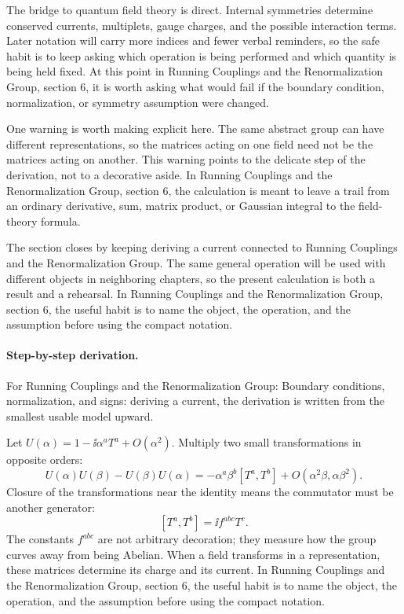 The bridge to quantum field theory is direct.  Internal symmetries determine conserved currents, multiplets, gauge charges, and the possible interaction terms.  Later notation will carry more indices and fewer verbal reminders, so the safe habit is to keep asking which operation is being performed and which quantity is being held fixed.  At this point in Running Couplings and the Renormalization Group, section 6, it is worth asking what would fail if the boundary condition, normalization, or symmetry assumption were changed.

One warning is worth making explicit here.  The same abstract group can have different representations, so the matrices acting on one field need not be the matrices acting on another.  This warning points to the delicate step of the derivation, not to a decorative aside.  In Running Couplings and the Renormalization Group, section 6, the calculation is meant to leave a trail from an ordinary derivative, sum, matrix product, or Gaussian integral to the field-theory formula.

The section closes by keeping deriving a current connected to Running Couplings and the Renormalization Group.  The same general operation will be used with different objects in neighboring chapters, so the present calculation is both a result and a rehearsal.  In Running Couplings and the Renormalization Group, section 6, the useful habit is to name the object, the operation, and the assumption before using the compact notation.



\paragraph{Step-by-step derivation.}

For Running Couplings and the Renormalization Group: Boundary conditions, normalization, and signs: deriving a current, the derivation is written from the smallest usable model upward.

Let \(U(\alpha)=1-\ii\alpha^aT^a+O(\alpha^2)\).  Multiply two small transformations in opposite orders:
\[
  U(\alpha)U(\beta)-U(\beta)U(\alpha)
  =
  -\alpha^a\beta^b[T^a,T^b]+O(\alpha^2\beta,\alpha\beta^2).
\]
Closure of the transformations near the identity means the commutator must be another generator:
\[
  [T^a,T^b]=\ii f^{abc}T^c.
\]
The constants \(f^{abc}\) are not arbitrary decoration; they measure how the group curves away from being Abelian.  When a field transforms in a representation, these matrices determine its charge and its current.  In Running Couplings and the Renormalization Group, section 6, the useful habit is to name the object, the operation, and the assumption before using the compact notation.

